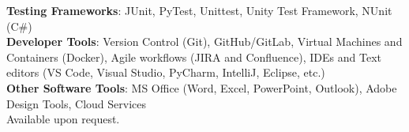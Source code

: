 \textbf{Testing Frameworks}: JUnit, 
PyTest, Unittest, Unity Test Framework, NUnit (C\#)\\
\textbf{Developer Tools}: Version Control (Git), 
GitHub/GitLab, Virtual Machines and Containers (Docker), 
Agile workflows (JIRA and Confluence), IDEs and Text editors 
(VS Code, Visual Studio, PyCharm, IntelliJ, Eclipse, etc.)\\
\textbf{Other Software Tools}: 
MS Office (Word, Excel, PowerPoint, Outlook), 
Adobe Design Tools, Cloud Services \\ 
\newline
Available upon request.

